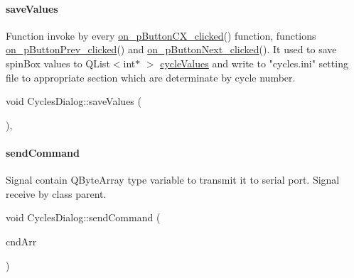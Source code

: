 \mbox{\label{classCyclesDialog_a26c86ed543a9345f230fb8925ccae5d9}} 
\paragraph{\texorpdfstring{save\+Values}{saveValues}}
Function invoke by every \mbox{\hyperlink{classCyclesDialog_a0ce26519321c0a05a2829861468575b8}{on\+\_\+p\+Button\+CX\+\_\+clicked}}() function, functions \mbox{\hyperlink{classCyclesDialog_a1e4ad2ee11ec162987d24e2071c3f5c4}{on\+\_\+p\+Button\+Prev\+\_\+clicked}}() and \mbox{\hyperlink{classCyclesDialog_a2f918e498a7c5cd77b12edb6923fb78d}{on\+\_\+p\+Button\+Next\+\_\+clicked}}(). It used to save spinBox values to Q\+List$<$int$\ast$ $>$ \mbox{\hyperlink{classCyclesDialog_a6c5035971ebd473201fa9c62e58fee3a}{cycle\+Values}} and write to "cycles.ini" setting file to appropriate section which are determinate by cycle number.\\
{\footnotesize\ttfamily void Cycles\+Dialog\+::save\+Values (\begin{DoxyParamCaption}\item[{void}]{ }\end{DoxyParamCaption}){\ttfamily [private]}, {\ttfamily [slot]}}

\mbox{\label{classCyclesDialog_a6dabe9aeecfb9264a4b6014d74241432}} 
\paragraph{\texorpdfstring{send\+Command}{sendCommand}}
Signal contain QByteArray type variable to transmit it to serial port. Signal receive by class parent.\\
{\footnotesize\ttfamily void Cycles\+Dialog\+::send\+Command (\begin{DoxyParamCaption}\item[{Q\+Byte\+Array}]{cnd\+Arr }\end{DoxyParamCaption}){\ttfamily [signal]}}

\mbox{\label{classCyclesDialog_a5e6a1c6ccd9ad82de8f0ecdc8b3e064a}} 
